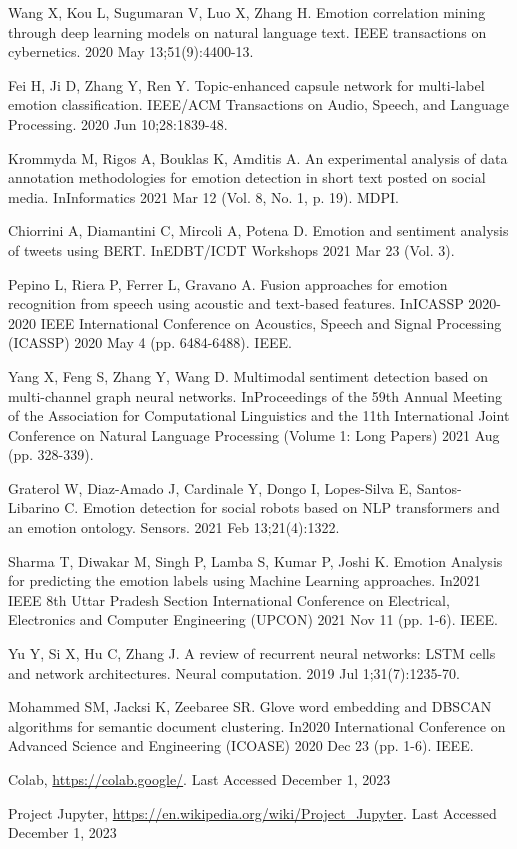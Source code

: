 \documentclass[12pt,notitlepage,oneside]{report}
\begin{document}
\begin{thebibliography}{8}
Wang X, Kou L, Sugumaran V, Luo X, Zhang H. Emotion correlation mining through deep learning models on natural language text. IEEE transactions on cybernetics. 2020 May 13;51(9):4400-13.

Fei H, Ji D, Zhang Y, Ren Y. Topic-enhanced capsule network for multi-label emotion classification. IEEE/ACM Transactions on Audio, Speech, and Language Processing. 2020 Jun 10;28:1839-48.

Krommyda M, Rigos A, Bouklas K, Amditis A. An experimental analysis of data annotation methodologies for emotion detection in short text posted on social media. InInformatics 2021 Mar 12 (Vol. 8, No. 1, p. 19). MDPI.

Chiorrini A, Diamantini C, Mircoli A, Potena D. Emotion and sentiment analysis of tweets using BERT. InEDBT/ICDT Workshops 2021 Mar 23 (Vol. 3).

Pepino L, Riera P, Ferrer L, Gravano A. Fusion approaches for emotion recognition from speech using acoustic and text-based features. InICASSP 2020-2020 IEEE International Conference on Acoustics, Speech and Signal Processing (ICASSP) 2020 May 4 (pp. 6484-6488). IEEE.

Yang X, Feng S, Zhang Y, Wang D. Multimodal sentiment detection based on multi-channel graph neural networks. InProceedings of the 59th Annual Meeting of the Association for Computational Linguistics and the 11th International Joint Conference on Natural Language Processing (Volume 1: Long Papers) 2021 Aug (pp. 328-339).

Graterol W, Diaz-Amado J, Cardinale Y, Dongo I, Lopes-Silva E, Santos-Libarino C. Emotion detection for social robots based on NLP transformers and an emotion ontology. Sensors. 2021 Feb 13;21(4):1322.

Sharma T, Diwakar M, Singh P, Lamba S, Kumar P, Joshi K. Emotion Analysis for predicting the emotion labels using Machine Learning approaches. In2021 IEEE 8th Uttar Pradesh Section International Conference on Electrical, Electronics and Computer Engineering (UPCON) 2021 Nov 11 (pp. 1-6). IEEE.

Yu Y, Si X, Hu C, Zhang J. A review of recurrent neural networks: LSTM cells and network architectures. Neural computation. 2019 Jul 1;31(7):1235-70.

Mohammed SM, Jacksi K, Zeebaree SR. Glove word embedding and DBSCAN algorithms for semantic document clustering. In2020 International Conference on Advanced Science and Engineering (ICOASE) 2020 Dec 23 (pp. 1-6). IEEE.

Colab, \url{https://colab.google/}. Last Accessed December 1, 2023

Project Jupyter, \url{https://en.wikipedia.org/wiki/Project_Jupyter}. Last Accessed December 1, 2023

\end{thebibliography}

\printindex

\appendix
%
\end{document}
